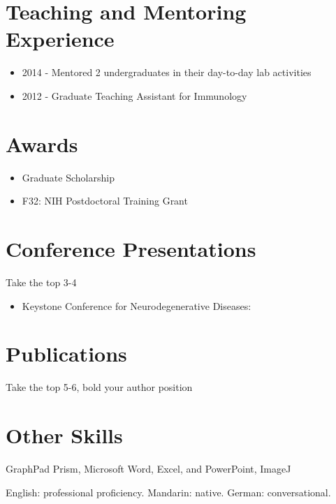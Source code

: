 \documentclass{article}
\begin{document}
\section{Teaching and Mentoring Experience }
\begin{itemize}
\item 2014 - Mentored 2 undergraduates in their day-to-day lab activities
\item 2012 - Graduate Teaching Assistant for Immunology
\end{itemize}

\section{Awards}
\begin{itemize}
\item Graduate Scholarship 
\item F32: NIH Postdoctoral Training Grant
\end{itemize}

\section{Conference Presentations }

Take the top 3-4
\begin{itemize}
\item Keystone Conference for Neurodegenerative Diseases:
\end{itemize}

 
\section{Publications}
Take the top 5-6, bold your author position 


\section{Other Skills}
\begin{description}[widest=Langauges]
\item[Software]	GraphPad Prism, Microsoft Word, Excel, and PowerPoint, ImageJ
\item[Languages]	English: professional proficiency.  Mandarin: native.  German: conversational.
\end{description}
\end{document}
